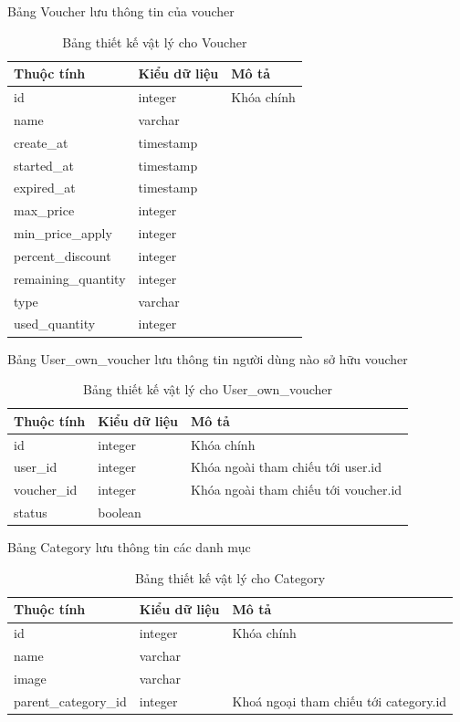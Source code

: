 \noindent Bảng Voucher lưu thông tin của voucher
\begin{table}[H]
\centering
\begin{tabular}{|p{4cm}|p{3cm}|p{7cm}|}
\hline
Thuộc tính & Kiểu dữ liệu & Mô tả \\
\hline
id & integer & Khóa chính \\
\hline
name & varchar & \\
\hline
create\_at & timestamp & \\
\hline
started\_at & timestamp & \\
\hline
expired\_at & timestamp & \\
\hline
max\_price & integer & \\
\hline
min\_price\_apply & integer & \\
\hline
percent\_discount & integer & \\
\hline
remaining\_quantity & integer & \\
\hline
type & varchar & \\
\hline
used\_quantity & integer & \\
\hline


\end{tabular}
\caption{Bảng thiết kế vật lý cho Voucher}
\end{table}
\newpage
\noindent Bảng User\_own\_voucher lưu thông tin người dùng nào sở hữu voucher
\begin{table}[H]
\centering
\begin{tabular}{|p{4cm}|p{3cm}|p{7cm}|}
\hline
Thuộc tính & Kiểu dữ liệu & Mô tả \\
\hline
id & integer & Khóa chính \\
\hline
user\_id & integer & Khóa ngoài tham chiếu tới user.id \\
\hline
voucher\_id & integer & Khóa ngoài tham chiếu tới voucher.id \\
\hline
status & boolean & \\
\hline

\end{tabular}
\caption{Bảng thiết kế vật lý cho User\_own\_voucher}
\end{table}

\noindent Bảng Category lưu thông tin các danh mục
\begin{table}[H]
\centering
\begin{tabular}{|p{4cm}|p{3cm}|p{7cm}|}
\hline
Thuộc tính & Kiểu dữ liệu & Mô tả \\
\hline
id & integer & Khóa chính \\
\hline
name & varchar & \\
\hline
image & varchar & \\
\hline
parent\_category\_id & integer & Khoá ngoại tham chiếu tới category.id\\
\hline

\end{tabular}
\caption{Bảng thiết kế vật lý cho Category}
\end{table}

